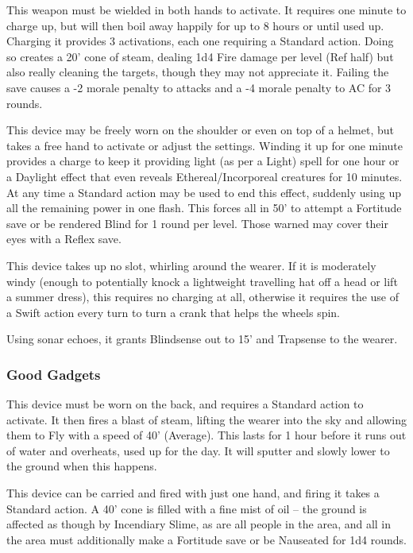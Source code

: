 {This weapon must be wielded in both hands to activate. It requires one minute to charge up, but will then boil away happily for up to 8 hours or until used up. Charging it provides 3 activations, each one requiring a Standard action. Doing so creates a 20' cone of steam, dealing 1d4 Fire damage per level (Ref half) but also really cleaning the targets, though they may not appreciate it. Failing the save causes a -2 morale penalty to attacks and a -4 morale penalty to AC for 3 rounds.}

{This device may be freely worn on the shoulder or even on top of a helmet, but takes a free hand to activate or adjust the settings. Winding it up for one minute provides a charge to keep it providing light (as per a Light) spell for one hour or a Daylight effect that even reveals Ethereal/Incorporeal creatures for 10 minutes. At any time a Standard action may be used to end this effect, suddenly using up all the remaining power in one flash. This forces all in 50' to attempt a Fortitude save or be rendered Blind for 1 round per level. Those warned may cover their eyes with a Reflex save.}

{This device takes up no slot, whirling around the wearer. If it is moderately windy (enough to potentially knock a lightweight travelling hat off a head or lift a summer dress), this requires no charging at all, otherwise it requires the use of a Swift action every turn to turn a crank that helps the wheels spin.\medskip

\noindent Using sonar echoes, it grants Blindsense out to 15' and Trapsense to the wearer.}

\subsubsection{Good Gadgets}

{This device must be worn on the back, and requires a Standard action to activate. It then fires a blast of steam, lifting the wearer into the sky and allowing them to Fly with a speed of 40' (Average). This lasts for 1 hour before it runs out of water and overheats, used up for the day. It will sputter and slowly lower to the ground when this happens.}

{This device can be carried and fired with just one hand, and firing it takes a Standard action. A 40' cone is filled with a fine mist of oil -- the ground is affected as though by Incendiary Slime, as are all people in the area, and all in the area must additionally make a Fortitude save or be Nauseated for 1d4 rounds.}

